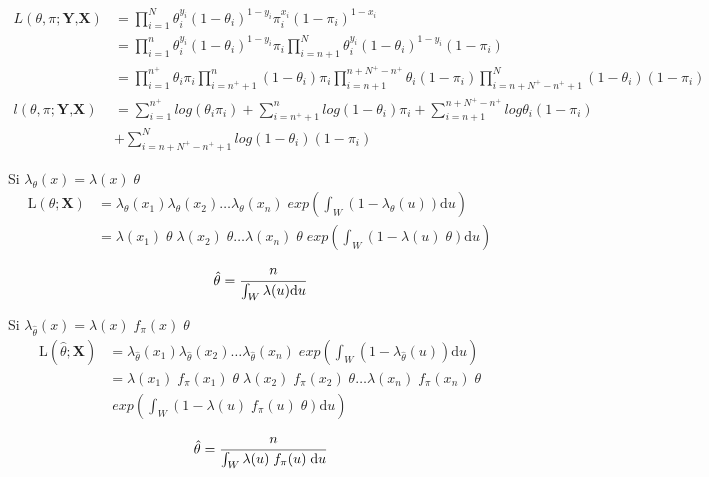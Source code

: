 \documentclass[12pt,a4paper,oneside]{report}
\begin{document}
\begin{align*}
L(\theta,\pi;\textbf{Y,X}) &=  \prod_{i=1}^N \theta_i^{y_i} (1-\theta_i)^{1-y_i} \pi_i^{x_i} (1-\pi_i)^{1-x_i}\\ 
&=  \prod_{i=1}^n \theta_i^{y_i} (1-\theta_i)^{1-y_i} \pi_i \prod_{i=n+1}^N \theta_i^{y_i} (1-\theta_i)^{1-y_i}(1-\pi_i)\\
&= \prod_{i=1}^{n^+} \theta_i \pi_i \prod_{i=n^++1}^{n} (1-\theta_i) \pi_i \prod_{i=n+1}^{n+N^+-n^+} \theta_i (1-\pi_i) \prod_{i=n+N^+-n^++1}^N (1-\theta_i)  (1-\pi_i)\\
l(\theta,\pi;\textbf{Y,X}) &= \sum_{i=1}^{n^+} log( \theta_i \pi_i) +  \sum_{i=n^++1}^{n} log(1-\theta_i)\pi_i + \sum_{i=n+1}^{n+N^+-n^+} log \theta_i (1-\pi_i) \\
&+ \sum_{i=n+N^+-n^++1}^N log(1-\theta_i)  (1-\pi_i)
\end{align*}

\newpage

Si $\lambda_\theta(x) =  \lambda(x) \; \theta $
\begin{align*}
\mathrm{L}(\theta; \textbf{X}) &= \lambda_{\theta}(x_1) \lambda_{\theta}(x_2) \dots \lambda_{\theta}(x_n) \; exp\left( \int_W (1-\lambda_{\theta}(u)) \mathrm{d} u \right)\\
&= \lambda(x_1) \; \theta \; \lambda(x_2) \; \theta\dots \lambda(x_n) \; \theta \; exp\left( \int_W (1-\lambda(u) \; \theta) \mathrm{d} u \right)
\end{align*}
\begin{equation*}
   \hat{ \theta} = \cfrac{n}{\int_W \lambda(u) \mathrm{d}u }
\end{equation*}



Si $\lambda_{\hat{\theta}}(x) =  \lambda(x) \; f_\pi(x) \; \theta  $
\begin{align*}
\mathrm{L}(\hat{\theta}; \textbf{X}) &= \lambda_{\hat{\theta}}(x_1) \lambda_{\hat{\theta}}(x_2) \dots \lambda_{\hat{\theta}}(x_n) \; exp\left( \int_W (1-\lambda_{\hat{\theta}}(u)) \mathrm{d} u \right)\\
&= \lambda(x_1) \; f_\pi(x_1) \; \theta \; \lambda(x_2) \; f_\pi(x_2) \; \theta \dots \lambda(x_n) \; f_\pi(x_n)  \; \theta \\ & \; exp\left( \int_W (1-\lambda(u) \; f_\pi(u) \; \theta) \mathrm{d} u \right)
\end{align*}
\begin{equation*}
    \hat{\theta} = \cfrac{n}{\int_W \lambda(u) \; f_\pi(u) \; \mathrm{d}u }
\end{equation*}
\end{document}
